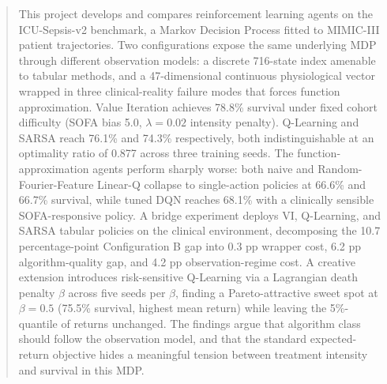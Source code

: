 \documentclass[11pt,a4paper]{article}
\begin{document}
\begin{abstract}\noindent
This project develops and compares reinforcement learning agents on the ICU-Sepsis-v2 benchmark, a Markov Decision Process fitted to MIMIC-III patient trajectories. Two configurations expose the same underlying MDP through different observation models: a discrete 716-state index amenable to tabular methods, and a 47-dimensional continuous physiological vector wrapped in three clinical-reality failure modes that forces function approximation. Value Iteration achieves 78.8\% survival under fixed cohort difficulty (SOFA bias 5.0, $\lambda = 0.02$ intensity penalty). Q-Learning and SARSA reach 76.1\% and 74.3\% respectively, both indistinguishable at an optimality ratio of 0.877 across three training seeds. The function-approximation agents perform sharply worse: both naive and Random-Fourier-Feature Linear-Q collapse to single-action policies at 66.6\% and 66.7\% survival, while tuned DQN reaches 68.1\% with a clinically sensible SOFA-responsive policy. A bridge experiment deploys VI, Q-Learning, and SARSA tabular policies on the clinical environment, decomposing the 10.7 percentage-point Configuration B gap into 0.3 pp wrapper cost, 6.2 pp algorithm-quality gap, and 4.2 pp observation-regime cost. A creative extension introduces risk-sensitive Q-Learning via a Lagrangian death penalty $\beta$ across five seeds per $\beta$, finding a Pareto-attractive sweet spot at $\beta = 0.5$ (75.5\% survival, highest mean return) while leaving the 5\%-quantile of returns unchanged. The findings argue that algorithm class should follow the observation model, and that the standard expected-return objective hides a meaningful tension between treatment intensity and survival in this MDP.
\end{abstract}


\FloatBarrier

\FloatBarrier

\FloatBarrier

\FloatBarrier


\clearpage


\end{document}
